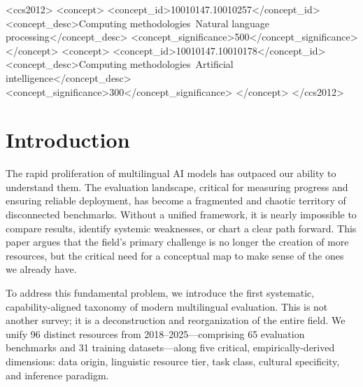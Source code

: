 \documentclass[acmsmall]{acmart}
\begin{document}
\begin{CCSXML}
<ccs2012>
<concept>
<concept_id>10010147.10010257</concept_id>
<concept_desc>Computing methodologies~Natural language processing</concept_desc>
<concept_significance>500</concept_significance>
</concept>
<concept>
<concept_id>10010147.10010178</concept_id>
<concept_desc>Computing methodologies~Artificial intelligence</concept_desc>
<concept_significance>300</concept_significance>
</concept>
</ccs2012>
\end{CCSXML}




\maketitle

\section{Introduction}
The rapid proliferation of multilingual AI models has outpaced our ability to understand them. The evaluation landscape, critical for measuring progress and ensuring reliable deployment, has become a fragmented and chaotic territory of disconnected benchmarks. Without a unified framework, it is nearly impossible to compare results, identify systemic weaknesses, or chart a clear path forward. This paper argues that the field's primary challenge is no longer the creation of more resources, but the critical need for a conceptual map to make sense of the ones we already have.

To address this fundamental problem, we introduce the first systematic, capability-aligned taxonomy of modern multilingual evaluation. This is not another survey; it is a deconstruction and reorganization of the entire field. We unify 96 distinct resources from 2018–2025—comprising 65 evaluation benchmarks and 31 training datasets—along five critical, empirically-derived dimensions: data origin, linguistic resource tier, task class, cultural specificity, and inference paradigm.
\end{document}
